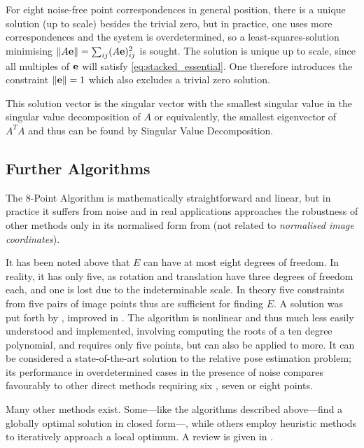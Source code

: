 \newcommand{\norm}[1]{\left\lVert#1\right\rVert}

For eight noise-free point correspondences in general position, there is a
unique solution (up to scale) besides the trivial zero, but in practice, one uses more correspondences and the system
is overdetermined, so a least-squares-solution minimising $\norm{ A\mbf{e} } = \sum_{ij} (A\mbf{e})_{ij}^2$ is sought. 
The solution is unique up to scale, since all multiples of $\mathbf{e}$ will
satisfy \eqref{eq:stacked_essential}. One therefore introduces the constraint
$\norm{ \mbf{e} } = 1$ which also excludes a trivial zero solution.

This solution vector is the singular
vector with the smallest singular value in the singular value decomposition of
$A$ or equivalently, the smallest eigenvector of $A^TA$ \citep[see][]{hartley1997}
and thus can be found by Singular Value Decomposition.

\subsection{Further Algorithms}

The 8-Point Algorithm is mathematically straightforward and linear, but in
practice it suffers from noise \citep[see][]{luong1993} and in real
applications approaches the robustness of other methods only in its normalised
form from \citep{hartley1997} (not related to \emph{normalised image
coordinates}).

It has been noted above that $E$ can have at most eight degrees of freedom. In
reality, it has only five, as rotation and translation have three degrees of
freedom each, and one is lost due to the indeterminable scale. In theory five
constraints from five pairs of image points thus are sufficient for finding $E$.
A solution was put forth by \citet{nister2004}, improved in
\citep{stewenius-engels-nister2006}. The algorithm is nonlinear and
thus much less easily understood and implemented, involving computing the roots
of a ten degree polynomial, and requires only five points, but can also be
applied to more. It can be considered a state-of-the-art solution to the
relative pose estimation problem; its performance in overdetermined cases in the
presence of noise compares favourably to other
direct methods requiring six \citep{pizarro2003}, seven or eight points.

Many other methods exist. Some---like the algorithms described above---find a
globally optimal solution in closed form---, while others employ heuristic
methods to iteratively approach a local optimum. A review is given in \citep{zhang1998}.

